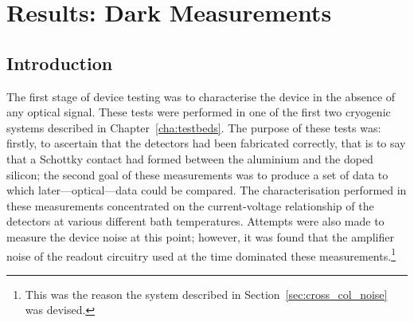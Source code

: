 \chapter{Results: Dark Measurements}
\label{cha:darkResults}
\section{Introduction}\label{sec:darkresults_introduction}
The first stage of device testing was to characterise the device in the absence of any optical signal. These tests were performed in one of the first two cryogenic systems described in Chapter~\ref{cha:testbeds}. The purpose of these tests was: firstly, to ascertain that the detectors had been fabricated correctly, that is to say that a Schottky contact had formed between the aluminium and the doped silicon; the second goal of these measurements was to produce a set of data to which later---optical---data could be compared. The characterisation performed in these measurements concentrated on the current-voltage relationship of the detectors at various different bath temperatures. Attempts were also made to measure the device noise at this point; however, it was found that the amplifier noise of the readout circuitry used at the time dominated these measurements.\footnote{This was the reason the system described in Section~\ref{sec:cross_col_noise} was devised.}
%
